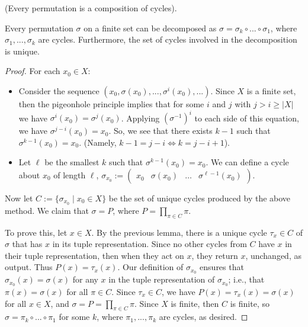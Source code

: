 \begin{theorem}
    (Every permutation is a composition of cycles).

    Every permutation $\sigma$ on a finite set can be decomposed as $\sigma = \sigma_k \circ ... \circ \sigma_1$, where $\sigma_1, ..., \sigma_k$ are cycles. Furthermore, the set of cycles involved in the decomposition is unique.
\end{theorem}

\begin{proof}
    For each $x_0 \in X$:

    \begin{itemize}
        \item Consider the sequence $(x_0, \sigma(x_0), ..., \sigma^i(x_0), ...)$. Since $X$ is a finite set, then the pigeonhole principle implies that for some $i$ and $j$ with $j > i \geq |X|$ we have $\sigma^i(x_0) = \sigma^j(x_0)$. Applying $(\sigma^{-1})^i$ to each side of this equation, we have $\sigma^{j - i}(x_0) = x_0$. So, we see that there exists $k - 1$ such that $\sigma^{k - 1}(x_0) = x_0$. (Namely, $k - 1 = j - i \iff k = j - i + 1$).
        \item Let $\ell$ be the smallest $k$ such that $\sigma^{k - 1}(x_0) = x_0$. We can define a cycle about $x_0$ of length $\ell$, $\sigma_{x_0} := \begin{pmatrix} x_0 & \sigma(x_0) & \hdots & \sigma^{\ell - 1}(x_0) \end{pmatrix}$.
    \end{itemize}

    Now let $C := \{ \sigma_{x_0} \mid x_0 \in X \}$ be the set of unique cycles produced by the above method. We claim that $\sigma = P$, where $P = \prod_{\pi \in C} \pi$.
    
    To prove this, let $x \in X$. By the previous lemma, there is a unique cycle $\tau_x \in C$ of $\sigma$ that has $x$ in its tuple representation. Since no other cycles from $C$ have $x$ in their tuple representation, then when they act on $x$, they return $x$, unchanged, as output. Thus $P(x) = \tau_x(x)$. Our definition of $\sigma_{x_0}$ ensures that $\sigma_{x_0}(x) = \sigma(x)$ for any $x$ in the tuple representation of $\sigma_{x_0}$; i.e., that $\pi(x) = \sigma(x)$ for all $\pi \in C$. Since $\tau_x \in C$, we have $P(x) = \tau_x(x) = \sigma(x)$ for all $x \in X$, and $\sigma = P = \prod_{\pi \in C} \pi$. Since $X$ is finite, then $C$ is finite, so $\sigma = \pi_k \circ ... \circ \pi_1$ for some $k$, where $\pi_1, ..., \pi_k$ are cycles, as desired.


\end{proof}
